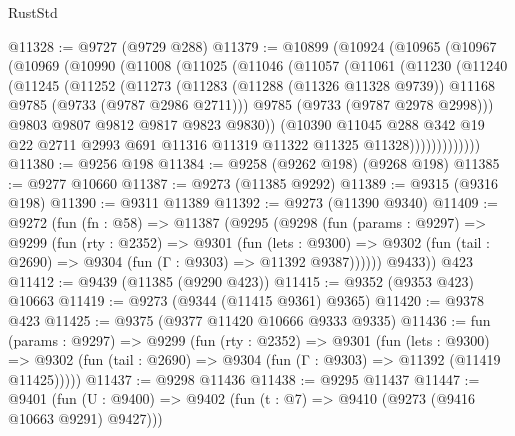 \begin{lexlean}{RustStd}
\begin{coremodule}
@11328 := @9727 (@9729 @288)
@11379 := @10899
    (@10924
      (@10965
        (@10967
          (@10969
            (@10990
              (@11008
                (@11025
                  (@11046
                    (@11057
                      (@11061
                        (@11230
                          (@11240
                            (@11245
                              (@11252
                                (@11273
                                  (@11283
                                    (@11288 (@11326 @11328 @9739))
                                    @11168
                                    @9785
                                    (@9733 (@9787 @2986 @2711)))
                                  @9785
                                  (@9733 (@9787 @2978 @2998)))
                                @9803
                                @9807
                                @9812
                                @9817
                                @9823
                                @9830))
                            (@10390
                              @11045
                              @288
                              @342
                              @19
                              @22
                              @2711
                              @2993
                              @691
                              @11316
                              @11319
                              @11322
                              @11325
                              @11328)))))))))))))
@11380 := @9256 @198
@11384 := @9258 (@9262 @198) (@9268 @198)
@11385 := @9277 @10660
@11387 := @9273 (@11385 @9292)
@11389 := @9315 (@9316 @198)
@11390 := @9311 @11389
@11392 := @9273 (@11390 @9340)
@11409 := @9272
    (fun (fn : @58) =>
    @11387
      (@9295
        (@9298
          (fun (params : @9297) =>
          @9299
            (fun (rty : @2352) =>
            @9301
              (fun (lets : @9300) =>
              @9302 (fun (tail : @2690) => @9304 (fun (Γ : @9303) => @11392 @9387))))))
        @9433))
    @423
@11412 := @9439 (@11385 (@9290 @423))
@11415 := @9352 (@9353 @423) @10663
@11419 := @9273 (@9344 (@11415 @9361) @9365)
@11420 := @9378 @423
@11425 := @9375 (@9377 @11420 @10666 @9333 @9335)
@11436 := fun (params : @9297) =>
  @9299
    (fun (rty : @2352) =>
    @9301
      (fun (lets : @9300) =>
      @9302 (fun (tail : @2690) => @9304 (fun (Γ : @9303) => @11392 (@11419 @11425)))))
@11437 := @9298 @11436
@11438 := @9295 @11437
@11447 := @9401
    (fun (U : @9400) => @9402 (fun (t : @7) => @9410 (@9273 (@9416 @10663 @9291) @9427)))

\end{coremodule}
\end{lexlean}
